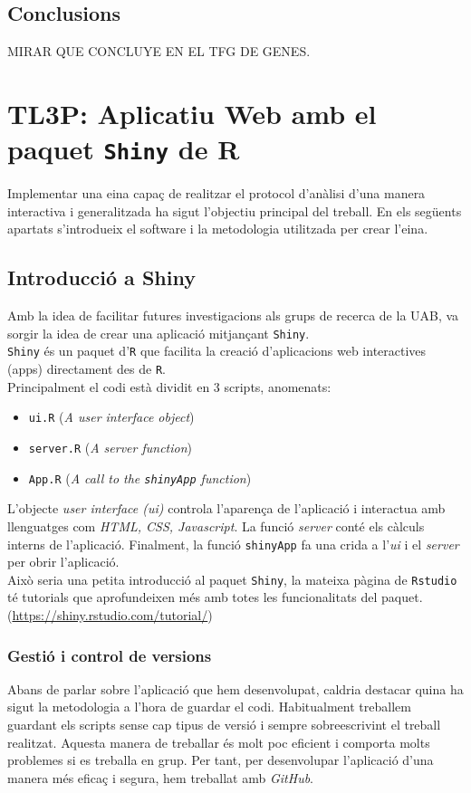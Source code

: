 \documentclass[english]{article}
\begin{document}
\subsection{Conclusions}
MIRAR QUE CONCLUYE EN EL TFG DE GENES.
\clearpage
\section{TL3P: Aplicatiu Web amb el paquet \texttt{Shiny} de R}
Implementar una eina capa\c{c} de realitzar el protocol d'anàlisi d'una manera interactiva i generalitzada ha sigut l'objectiu principal del treball. En els següents apartats s'introdueix el software i la metodologia utilitzada per crear l'eina.
\subsection{Introducció a Shiny}
Amb la idea de facilitar futures investigacions als grups de recerca de la UAB, va sorgir la idea de crear una aplicació mitjan\c{c}ant \texttt{Shiny}.
\\

\texttt{Shiny} és un paquet d'\texttt{R} que facilita la creació d'aplicacions web interactives (apps) directament des de \texttt{R}.
\\

Principalment el codi està dividit en 3 scripts, anomenats:
\begin{itemize}
\item \texttt{ui.R} (\textit{A user interface object})
\item \texttt{server.R} (\textit{A server function})
\item \texttt{App.R} (\textit{A call to the \texttt{shinyApp} function})
\end{itemize}
L'objecte \textit{user interface (ui)} controla l'aparen\c{c}a de l'aplicació i interactua amb llenguatges com \textit{HTML, CSS, Javascript}. La funció \textit{server} conté els càlculs interns de l'aplicació. Finalment, la funció \texttt{shinyApp} fa una crida a l'\textit{ui} i el \textit{server} per obrir l'aplicació.
\\

Això seria una petita introducció al paquet \texttt{Shiny}, la mateixa pàgina de \texttt{Rstudio} té tutorials que aprofundeixen més amb totes les funcionalitats del paquet. (\url{https://shiny.rstudio.com/tutorial/})

\subsubsection{Gestió i control de versions}
Abans de parlar sobre l'aplicació que hem desenvolupat, caldria destacar quina ha sigut la metodologia a l'hora de guardar el codi. Habitualment treballem guardant els scripts sense cap tipus de versió i sempre sobreescrivint el treball realitzat. Aquesta manera de treballar és molt poc eficient i comporta molts problemes si es treballa en grup. Per tant, per desenvolupar l'aplicació d'una manera més efica\c{c} i segura, hem treballat amb \textit{GitHub}.
\\
\end{document}
